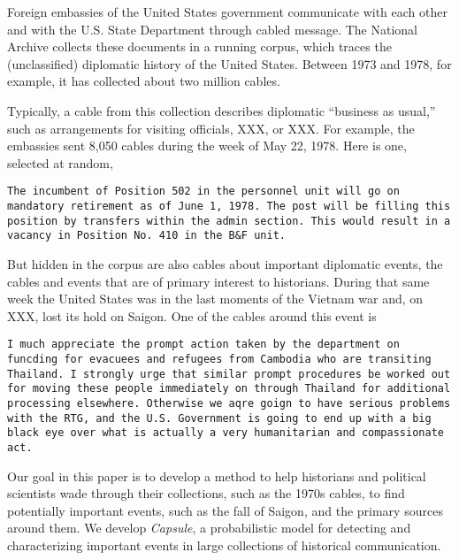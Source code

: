 


Foreign embassies of the United States government communicate with
each other and with the U.S. State Department through cabled message.
The National Archive collects these documents in a running corpus,
which traces the (unclassified) diplomatic history of the United
States. Between 1973 and 1978, for example, it has collected about two
million cables.

Typically, a cable from this collection describes diplomatic ``business as usual,'' such as arrangements for visiting officials, XXX, or XXX. For example,
the embassies sent 8,050 cables during the week of May 22, 1978. Here is one,
selected at random,
\begin{shaded*} {\tt The incumbent of Position 502 in the personnel unit will go
on mandatory retirement as of June 1, 1978.  The post will be
filling this position by transfers within the admin section.
This would result in a vacancy in Position No.~410 in the B\&F unit.}
\end{shaded*}

But hidden in the corpus are also cables about important diplomatic
events, the cables and events that are of primary interest to
historians. During that same week the United States was in the last
moments of the Vietnam war and, on XXX, lost its hold on Saigon. One
of the cables around this event is
\begin{shaded*}
  {\tt  I much appreciate the prompt action taken by the 
  department on funcding for evacuees and refugees from
  Cambodia who are transiting Thailand. I strongly urge
  that similar prompt procedures be worked out for moving these
  people immediately on through Thailand for additional processing
  elsewhere. Otherwise we aqre goign to have serious problems with the
  RTG, and the U.S.~Government is going to end up with a big black eye
  over what is actually a very humanitarian and compassionate act.}
\end{shaded*}

Our goal in this paper is to develop a method to help historians and
political scientists wade through their collections, such as the 1970s
cables, to find potentially important events, such as the fall of
Saigon, and the primary sources around them. We develop
\textit{Capsule}, a probabilistic model for detecting and
characterizing important events in large collections of historical
communication.

